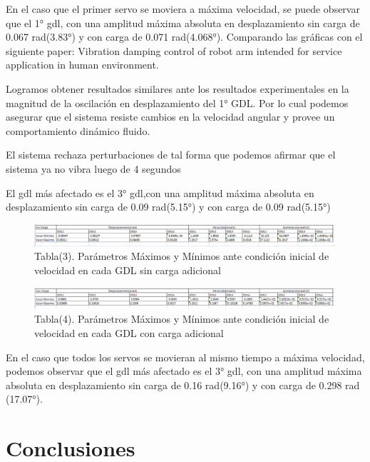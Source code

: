 \documentclass{aleph-revista}
\begin{document}
En el caso que el primer servo se moviera a máxima velocidad, se puede observar que el 1° gdl, con una amplitud máxima absoluta en desplazamiento sin carga de 0.067 rad(3.83°) y con carga de 0.071 rad(4.068°). Comparando las gráficas con el siguiente paper: Vibration damping control of robot arm intended for service application in human environment.

Logramos obtener resultados similares ante los resultados experimentales en la magnitud de la oscilación en desplazamiento del 1° GDL. Por lo cual podemos asegurar que el sistema resiste cambios en la velocidad angular y provee un comportamiento dinámico fluido.

El sistema rechaza perturbaciones de tal forma que podemos afirmar que el sistema ya no vibra luego de 4  segundos

El gdl más afectado es el 3° gdl,con una amplitud máxima absoluta en desplazamiento sin carga de 0.09 rad(5.15°) y con carga de 0.09 rad(5.15°)


\begin{figure}[H]
    \centering
    \includegraphics[width=1\textwidth]{Imagenes/t3.png}
    \caption{Tabla(3). Parámetros Máximos y Mínimos ante condición inicial de velocidad en cada GDL sin carga adicional}
    \label{fig:etiqueta de la figura}
\end{figure}

\begin{figure}[H]
    \centering
    \includegraphics[width=1\textwidth]{Imagenes/t4.png}
    \caption{Tabla(4). Parámetros Máximos y Mínimos ante condición inicial de velocidad en cada GDL con carga adicional}
    \label{fig:etiqueta de la figura}
\end{figure}

En el caso que todos los servos se movieran al mismo tiempo a máxima velocidad, podemos observar que el gdl más afectado es el 3° gdl, con una amplitud máxima absoluta en desplazamiento sin carga de 0.16 rad(9.16°) y con carga de 0.298 rad (17.07°).


\section{Conclusiones}
\end{document}
